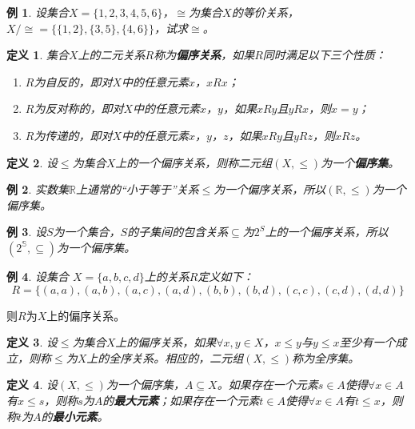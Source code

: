 \documentclass{book}[oneside]
\newtheorem{Def}{定义}[chapter]
\newtheorem{Example}{例}[chapter]
\begin{document}
\begin{CJK*}{UTF8}{gbsn}
  \begin{Example}
    设集合$X=\{1,2,3,4,5,6\}$，$\cong$为集合$X$的等价关系，$X/\cong=\{\{1,2\},\{3,5\},\{4,6\}\}$，试求$\cong$。
  \end{Example}
  \begin{Def}
    集合$X$上的二元关系$R$称为{\bfseries 偏序关系}，如果$R$同时满足以下三个性质：
    \begin{enumerate}
    \item $R$为自反的，即对$X$中的任意元素$x$，$xRx$；
    \item $R$为反对称的，即对$X$中的任意元素$x$，$y$，如果$xRy$且$yRx$，则$x=y$；
    \item $R$为传递的，即对$X$中的任意元素$x$，$y$，$z$，如果$xRy$且$yRz$，则$xRz$。
    \end{enumerate}
  \end{Def}
    \begin{Def}
    设$\leq$为集合$X$上的一个偏序关系，则称二元组$(X,\leq)$为一个{\bfseries 偏序集}。
  \end{Def}

    \begin{Example}
    实数集$\mathbb{R}$上通常的“小于等于”关系$\leq$为一个偏序关系，所以$(\mathbb{R},\leq)$为一个偏序集。
  \end{Example}
  \begin{Example}
    设$S$为一个集合，$S$的子集间的包含关系$\subseteq$为$2^S$上的一个偏序关系，所以$(2^{\mathbb{S}},\subseteq)$为一个偏序集。
  \end{Example}

  \begin{Example}
    设集合
    $X=\{a,b,c,d\}$上的关系$R$定义如下：
    \begin{equation*}
      R=\{(a,a),(a,b),(a,c),(a,d),(b,b),(b,d),(c,c),(c,d),(d,d)\}
    \end{equation*}
  \end{Example}
  则$R$为$X$上的偏序关系。

    \begin{Def}
    设$\leq$为集合$X$上的偏序关系，如果$\forall x, y \in X$，$x \leq y$与$y \leq x$至少有一个成立，则称$\leq$为$X$上的全序关系。相应的，二元组$(X,\leq)$称为全序集。
  \end{Def}

  \begin{Def}
    设$(X,\leq)$为一个偏序集，$A\subseteq X$。如果存在一个元素$s\in A$使得$\forall x \in A$有$x \leq s$，则称$s$为$A$的{\bfseries 最大元素}；如果存在一个元素$t\in A$使得$\forall x \in A$有$t \leq x$，则称$t$为$A$的{\bfseries 最小元素}。
  \end{Def}


\end{CJK*}
\end{document}
